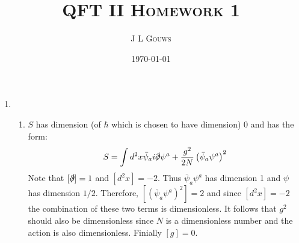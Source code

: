 \documentclass[12pt,a4]{article}
\title{
\textsc{QFT II Homework 1}
}
\author{\textsc{J L Gouws}
}
\date{\today
\\[1cm]}
\begin{document}
\thispagestyle{empty}

\maketitle

\begin{enumerate}
  \item
    \begin{enumerate}
      \item 
        $S$ has dimension (of $\hbar$ which is chosen to have dimension) 0 and has the form:
        \begin{equation*}
          S = \int d^2x \bar{\psi}_a i \slashed{\partial} \psi^a + \frac{g^2}{2N} \left(\bar{\psi}_a \psi^a\right)^2
        \end{equation*}
        Note that $[\slashed{\partial}] = 1$ and $[d^2x] = -2$.
        Thus $\bar{\psi}_a \psi^a$ has dimension 1 and $\psi$ has dimension $1/2$.
        Therefore, $[\left(\bar{\psi}_a \psi^a\right)^2] = 2$ and since $[d^2x] = -2$ the combination of these two terms is dimensionless.
        It follows that $g^2$ should also be dimensionless since $N$ is a dimensionless number and the action is also dimensionless.
        Finially $[g] = 0$.


\end{enumerate}
\end{enumerate}
\end{document}
